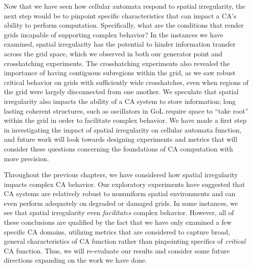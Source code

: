 \documentclass[a4paper,11pt]{article}
\begin{document}
Now that we have seen how cellular automata respond to spatial irregularity, the next step would be to pinpoint specific characteristics that can impact a CA's ability to perform computation. Specifically, what are the conditions that render grids incapable of supporting complex behavior? In the instances we have examined, spatial irregularity has the potential to hinder information transfer across the grid space, which we observed in both our generator point and crosshatching experiments. The crosshatching experiments also revealed the importance of having contiguous subregions within the grid, as we saw robust critical behavior on grids with sufficiently wide crosshatches, even when regions of the grid were largely disconnected from one another. We speculate that spatial irregularity also impacts the ability of a CA system to store information; long lasting coherent structures, such as oscillators in GoL require space to ``take root'' within the grid in order to facilitate complex behavior. We have made a first step in investigating the impact of spatial irregularity on cellular automata function, and future work will look towards designing experiments and metrics that will consider these questions concerning the foundations of CA computation with more precision.



Throughout the previous chapters, we have considered how spatial irregularity impacts complex CA behavior. Our exploratory experiments have suggested that CA systems are relatively robust to nonuniform spatial environments and can even perform adequately on degraded or damaged grids. In some instances, we see that spatial irregularity even \textit{facilitates} complex behavior. However, all of these conclusions are qualified by the fact that we have only examined a few specific CA domains, utilizing metrics that are considered to capture broad, general characteristics of CA function rather than pinpointing specifics of \textit{critical} CA function. Thus, we will re-evaluate our results and consider some future directions expanding on the work we have done.

\end{document}
